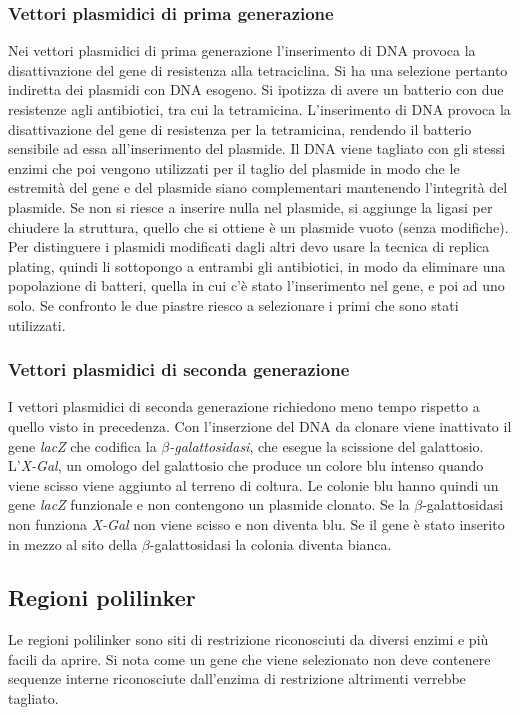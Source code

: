 		\subsubsection{Vettori plasmidici di prima generazione}
		Nei vettori plasmidici di prima generazione l'inserimento di DNA provoca la disattivazione del gene di resistenza alla tetraciclina. 
		Si ha una selezione pertanto indiretta dei plasmidi con DNA esogeno.
		Si ipotizza di avere un batterio con due resistenze agli antibiotici, tra cui la tetramicina. 
		L'inserimento di DNA provoca la disattivazione del gene di resistenza per la tetramicina, rendendo il batterio sensibile ad essa all'inserimento del plasmide.
		Il DNA viene tagliato con gli stessi enzimi che poi vengono utilizzati per il taglio del plasmide in modo che le estremità del gene e del plasmide siano complementari mantenendo l'integrità del plasmide. 
		Se non si riesce a inserire nulla nel plasmide, si aggiunge la ligasi per chiudere la struttura, quello che si ottiene è un plasmide vuoto (senza modifiche). 
		Per distinguere i plasmidi modificati dagli altri devo usare la tecnica di replica plating, quindi li sottopongo a entrambi gli antibiotici, in modo da eliminare una popolazione di batteri, quella in cui c'è stato l'inserimento nel gene, e poi ad uno solo.
		Se confronto le due piastre riesco a selezionare i primi che sono stati utilizzati. 

		\subsubsection{Vettori plasmidici di seconda generazione}
		I vettori plasmidici di seconda generazione richiedono meno tempo rispetto a quello visto in precedenza. 
		Con l'inserzione del DNA da clonare viene inattivato il gene \emph{lacZ} che codifica la \emph{$\beta$-galattosidasi}, che esegue la scissione del galattosio. 
		L'\emph{X-Gal}, un omologo del galattosio che produce un colore blu intenso quando viene scisso viene aggiunto al terreno di coltura. 
		Le colonie blu hanno quindi un gene \emph{lacZ} funzionale e non contengono un plasmide clonato.
		Se la $\beta$-galattosidasi non funziona \emph{X-Gal} non viene scisso e non diventa blu.
		Se il gene è stato inserito in mezzo al sito della $\beta$-galattosidasi la colonia diventa bianca. 

	\subsection{Regioni polilinker}
	Le regioni polilinker sono siti di restrizione riconosciuti da diversi enzimi e pi\`u facili da aprire.
	Si nota come un gene che viene selezionato non deve contenere sequenze interne riconosciute dall'enzima di restrizione altrimenti verrebbe tagliato.

